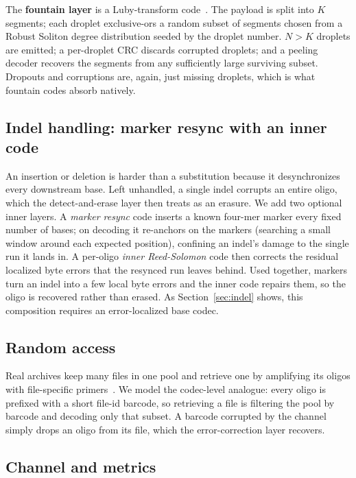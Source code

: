 \documentclass[11pt]{article}
\begin{document}
The \textbf{fountain layer} is a Luby-transform code~\cite{erlich2017}. The payload is split
into $K$ segments; each droplet exclusive-ors a random subset of segments chosen from a
Robust Soliton degree distribution seeded by the droplet number. $N > K$ droplets are
emitted; a per-droplet CRC discards corrupted droplets; and a peeling decoder recovers the
segments from any sufficiently large surviving subset. Dropouts and corruptions are, again,
just missing droplets, which is what fountain codes absorb natively.

\subsection{Indel handling: marker resync with an inner code}

An insertion or deletion is harder than a substitution because it desynchronizes every
downstream base. Left unhandled, a single indel corrupts an entire oligo, which the
detect-and-erase layer then treats as an erasure. We add two optional inner layers. A
\emph{marker resync} code inserts a known four-mer marker every fixed number of bases; on
decoding it re-anchors on the markers (searching a small window around each expected
position), confining an indel's damage to the single run it lands in. A per-oligo
\emph{inner Reed-Solomon} code then corrects the residual localized byte errors that the
resynced run leaves behind. Used together, markers turn an indel into a few local byte
errors and the inner code repairs them, so the oligo is recovered rather than erased. As
Section~\ref{sec:indel} shows, this composition requires an error-localized base codec.

\subsection{Random access}

Real archives keep many files in one pool and retrieve one by amplifying its oligos with
file-specific primers~\cite{organick2018}. We model the codec-level analogue: every oligo is
prefixed with a short file-id barcode, so retrieving a file is filtering the pool by
barcode and decoding only that subset. A barcode corrupted by the channel simply drops an
oligo from its file, which the error-correction layer recovers.

\subsection{Channel and metrics}
\end{document}
